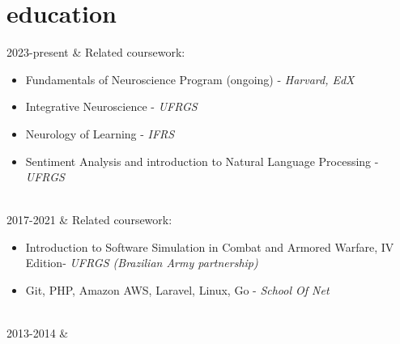 \documentclass[]{cv-mauri}
\begin{document}
\section*{education}
\begin{tabularcv}
	2023-present   &   
					\newline Related coursework:
					\begin{itemize}
						\item Fundamentals of Neuroscience Program (ongoing) - \textit{Harvard, EdX}
						\item Integrative Neuroscience - \textit{UFRGS}
						\item Neurology of Learning - \textit{IFRS}
						\item Sentiment Analysis and introduction to Natural Language Processing - \textit{UFRGS}
					\end{itemize} 
                    \\[\vspacepar] %
    2017-2021   &   
					\newline Related coursework:
					\begin{itemize}
						\item Introduction to Software Simulation in Combat and Armored Warfare, IV Edition- \textit{UFRGS (Brazilian Army partnership)}
						\item Git, PHP, Amazon AWS, Laravel, Linux, Go - \textit{School Of Net}
					\end{itemize} 
                    \\[\vspacepar] %
	2013-2014   &   
\end{tabularcv}
\end{document}
